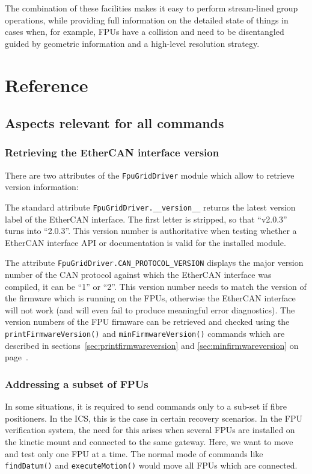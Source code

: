 \documentclass[fontsize=12,a4paper]{scrreprt}
\begin{document}
The combination of these facilities makes it easy to perform
stream-lined group operations, while providing full information on the
detailed state of things in cases when, for example, FPUs have a
collision and need to be disentangled guided by geometric information
and a high-level resolution strategy.


\part{Reference}
\label{sec:reference}

\chapter{Aspects relevant for all commands}

\section{Retrieving the EtherCAN interface version}
There are two attributes of the \texttt{FpuGridDriver} module
which allow to retrieve version information:

The standard attribute \texttt{FpuGridDriver.\_\_version\_\_} returns
the latest version label of the EtherCAN interface. The first letter
is stripped, so that ``v2.0.3'' turns into ``2.0.3''. This version
number is authoritative when testing whether a EtherCAN interface API
or documentation is valid for the installed module.

The attribute \texttt{FpuGridDriver.CAN\_PROTOCOL\_VERSION} displays
the major version number of the CAN protocol against which the
EtherCAN interface was compiled, it can be ``1'' or ``2''. This
version number needs to match the version of the firmware which is
running on the FPUs, otherwise the EtherCAN interface will not work
(and will even fail to produce meaningful error diagnostics). The
version numbers of the FPU firmware can be retrieved and checked using
the \texttt{printFirmwareVersion()} and \texttt{minFirmwareVersion()}
commands which are described in
sections~\ref{sec:printfirmwareversion} and
\ref{sec:minfirmwareversion} on
page~\pageref{sec:printfirmwareversion}.


\section{Addressing a subset of FPUs}
\label{sec:subsets}
 In some situations, it is required
to send commands only to a sub-set if fibre positioners. In the ICS,
this is the case in certain recovery scenarios.  In the FPU
verification system, the need for this arises when several FPUs are
installed on the kinetic mount and connected to the same
gateway. Here, we want to move and test only one FPU at a time. The
normal mode of commands like \texttt{findDatum()} and
\texttt{executeMotion()} would move all FPUs which are connected.
\end{document}
